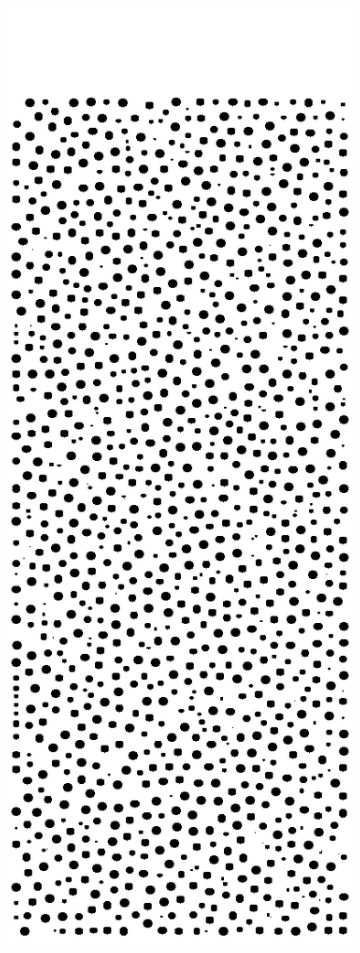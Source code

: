 \begin{figure}[ht]
        \centering
        \begin{subfigure}[b]{0.2\textwidth}
                \includegraphics[width=\textwidth]{figures/lbm/2d-res20-k050.png}

\end{subfigure}
\end{figure}
